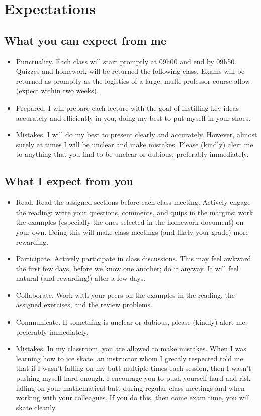 \section{Expectations}

\subsection{What you can expect from me}

\begin{itemize}
\item Punctuality. Each class will start promptly at 09h00 and end by 09h50. Quizzes and homework will be returned the following class. Exams will be returned as promptly as the logistics of a large, multi-professor course allow (expect within two weeks).
\item Prepared. I will prepare each lecture with the goal of instilling key ideas accurately and efficiently in you, doing my best to put myself in your shoes.
\item Mistakes. I will do my best to present clearly and accurately. However, almost surely at times I will be unclear and make mistakes. Please (kindly) alert me to anything that you find to be unclear or dubious, preferably immediately.
\end{itemize}



\subsection{What I expect from you}

\begin{itemize}
\item Read. Read the assigned sections before each class meeting. Actively engage the reading: write your questions, comments, and quips in the margins; work the examples (especially the ones selected in the homework document) on your own. Doing this will make class meetings (and likely your grade) more rewarding.
\item Participate. Actively participate in class discussions. This may feel awkward the first few days, before we know one another; do it anyway. It will feel natural (and rewarding!) after a few days.
\item Collaborate. Work with your peers on the examples in the reading, the assigned exercises, and the review problems.
\item Communicate. If something is unclear or dubious, please (kindly) alert me, preferably immediately.
\item Mistakes. In my classroom, you are allowed to make mistakes. When I was learning how to ice skate, an instructor whom I greatly respected told me that if I wasn't falling on my butt multiple times each session, then I wasn't pushing myself hard enough. I encourage you to push yourself hard and risk falling on your mathematical butt during regular class meetings and when working with your colleagues. If you do this, then come exam time, you will skate cleanly.
\end{itemize}